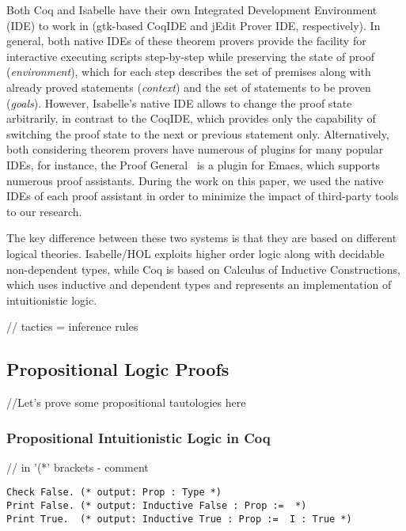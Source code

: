 \documentclass[article]{aaltoseries}
\begin{document}
Both Coq and Isabelle have their own Integrated Development Environment (IDE) to work in (gtk-based CoqIDE and jEdit Prover IDE, respectively). In general, both native IDEs of these theorem provers provide the facility for interactive executing scripts step-by-step while preserving the state of proof (\textit{environment}), which for each step describes the set of premises along with already proved statements (\textit{context}) and the set of statements to be proven (\textit{goals}). However, Isabelle's native IDE allows to change the proof state arbitrarily, in contrast to the CoqIDE, which provides only the capability of switching the proof state to the next or previous statement only. Alternatively, both considering theorem provers have numerous of plugins for many popular IDEs, for instance, the Proof General~\cite{tool_PG} is a plugin for Emacs, which supports numerous proof assistants. During the work on this paper, we used the native IDEs of each proof assistant in order to minimize the impact of third-party tools to our research.


The key difference between these two systems is that they are based on different logical theories. Isabelle/HOL exploits higher order logic along with decidable non-dependent types, while Coq is based on Calculus of Inductive Constructions, which uses inductive and dependent types and represents an implementation of intuitionistic logic.

// tactics = inference rules



\subsection{Propositional Logic Proofs}

//Let's prove some propositional tautologies here

\subsubsection{Propositional Intuitionistic Logic in Coq}

// in '(*' brackets - comment
\begin{lstlisting}[language=Coq,caption={Definition of basic propositional terms in Coq}]
Check False. (* output: Prop : Type *)
Print False. (* output: Inductive False : Prop :=  *)
Print True.  (* output: Inductive True : Prop :=  I : True *)
\end{lstlisting}
\end{document}
